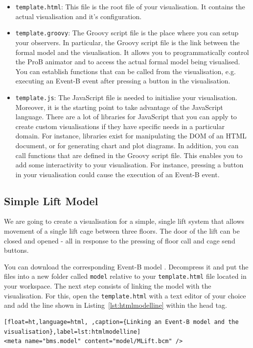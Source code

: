 \begin{itemize}
\item \texttt{template.html}: This file is the root file of your visualisation. It contains the actual visualisation and it's configuration.
\item \texttt{template.groovy}: The Groovy script file is the place where you can setup your observers.
In particular, the Groovy script file is the link between the formal model and the visualisation.
It allows you to programmatically control the ProB animator and to access the actual formal model being visualised.
You can establish functions that can be called from the visualisation, e.g. executing an Event-B event after pressing a button in the visualisation.
\item \texttt{template.js}: The JavaScript file is needed to initialise your visualisation.
Moreover, it is the starting point to take advantage of the JavaScript language.
There are a lot of libraries for JavaScript that you can apply to create custom visualisations if they have specific needs in a particular domain. 
For instance, libraries exist for manipulating the DOM of an HTML document, or for generating chart and plot diagrams.
In addition, you can call functions that are defined in the Groovy script file.
This enables you to add some interactivity to your visualisation.
For instance, pressing a button in your visualisation could cause the execution of an Event-B event.
\end{itemize}

\subsection{Simple Lift Model}

We are going to create a visualisation for a simple, single lift system that allows movement of a single lift cage between three floors.
The door of the lift can be closed and opened - all in response to the pressing of floor call and cage send buttons.

You can download the corresponding Event-B model .
Decompress it and put the files into a new folder called \texttt{model} relative to your \texttt{template.html} file located in your workspace.
The next step consists of linking the model with the visualisation.
For this, open the \texttt{template.html} with a text editor of your choice and add the line shown in Listing~\ref{lst:htmlmodelline} within the head tag.

\begin{lstlisting}[float=ht,language=html, ,caption={Linking an Event-B model and the visualisation},label=lst:htmlmodelline]
<meta name="bms.model" content="model/MLift.bcm" />
\end{lstlisting}


